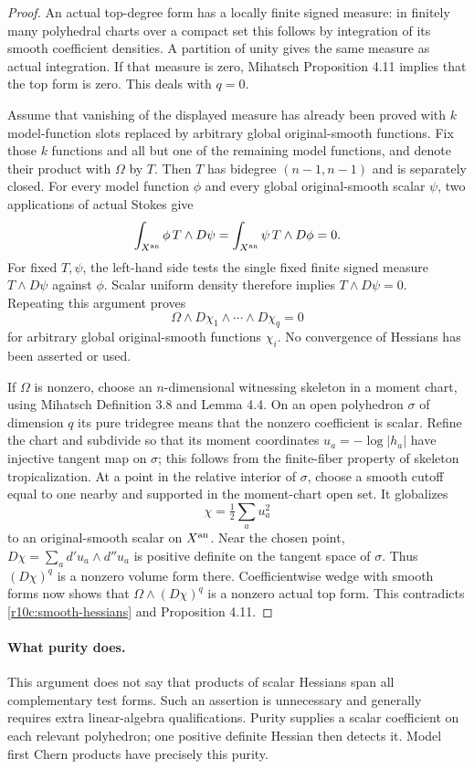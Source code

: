 \begin{proof}
An actual top-degree form has a locally finite signed measure: in finitely
many polyhedral charts over a compact set this follows by integration of
its smooth coefficient densities.  A partition of unity gives the same
measure as actual integration.  If that measure is zero, Mihatsch
Proposition 4.11 implies that the top form is zero.  This deals with $q=0$.

Assume that vanishing of the displayed measure has already been proved
with $k$ model-function slots replaced by arbitrary global original-smooth
functions.  Fix those $k$ functions and all but one of the remaining
model functions, and denote their product with $\Omega$ by $T$.
Then $T$ has bidegree $(n-1,n-1)$ and is separately closed.  For every
model function $\phi$ and every global original-smooth scalar $\psi$,
two applications of actual Stokes give
\[
 \int_{X^{\rm an}}\phi\,T\wedge D\psi
     =\int_{X^{\rm an}}\psi\,T\wedge D\phi=0.
\]
For fixed $T,\psi$, the left-hand side tests the single fixed finite
signed measure $T\wedge D\psi$ against $\phi$.  Scalar uniform density
therefore implies $T\wedge D\psi=0$.  Repeating this argument proves
\[
          \Omega\wedge D\chi_1\wedge\cdots\wedge D\chi_q=0
\tag{D}\label{r10c:smooth-hessians}
\]
for arbitrary global original-smooth functions $\chi_i$.
No convergence of Hessians has been asserted or used.

If $\Omega$ is nonzero, choose an $n$-dimensional witnessing skeleton
in a moment chart, using Mihatsch Definition 3.8 and Lemma 4.4.
On an open polyhedron $\sigma$ of dimension $q$ its pure tridegree
means that the nonzero coefficient is scalar.  Refine the chart and
subdivide so that its moment coordinates $u_a=-\log|h_a|$ have
injective tangent map on $\sigma$; this follows from the finite-fiber
property of skeleton tropicalization.  At a point in the relative
interior of $\sigma$, choose a smooth cutoff equal to one nearby and
supported in the moment-chart open set.  It globalizes
\[
                         \chi=\tfrac12\sum_a u_a^2
\]
to an original-smooth scalar on $X^{\rm an}$.  Near the chosen point,
$D\chi=\sum_a d'u_a\wedge d''u_a$ is positive definite on the tangent
space of $\sigma$.  Thus $(D\chi)^q$ is a nonzero volume form there.
Coefficientwise wedge with smooth forms now shows that
$\Omega\wedge(D\chi)^q$ is a nonzero actual top form.  This contradicts
\eqref{r10c:smooth-hessians} and Proposition 4.11.
\end{proof}

\paragraph{What purity does.}
This argument does not say that products of scalar Hessians span all
complementary test forms.  Such an assertion is unnecessary and generally
requires extra linear-algebra qualifications.  Purity supplies a scalar
coefficient on each relevant polyhedron; one positive definite Hessian
then detects it.  Model first Chern products have precisely this purity.

